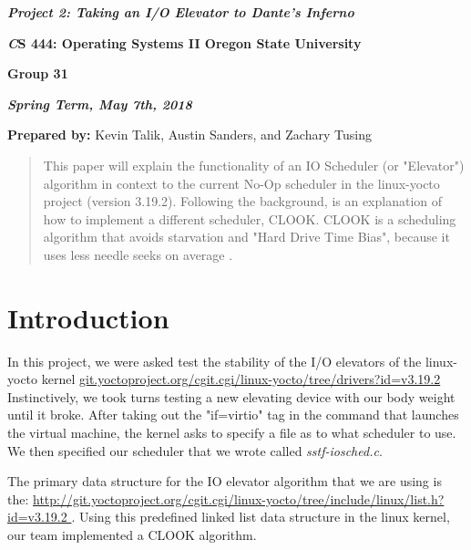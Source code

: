 \documentclass[onecolumn, draftclsnofoot,10pt, compsoc]{IEEEtran}
\def \ClassName{		CS 444: Operating Systems II }
\def \TeamNumber{		Group 31}
\def \GroupMemberOne{			Kevin Talik}
\def \GroupMemberTwo{			Austin Sanders}
\def \GroupMemberThree{			Zachary Tusing}
\begin{document}
 	\begin{center}
	\huge\bf{ } 
   
    \large\textbf{\textit{ Project 2: Taking an I/O Elevator to Dante's Inferno }}\par
     
    
    
	\small{\bf\textit \ClassName Oregon State University}\par
    \small{\bf{\TeamNumber}}
    
    
    {\bf\textit{ Spring Term, May 7th, 2018} }
    
    
    {\small {\bf Prepared by:} \GroupMemberOne, \GroupMemberTwo, and \GroupMemberThree }
        \end{center}
 		\vfill
		\begin{abstract}
        This paper will explain the functionality of an IO Scheduler (or "Elevator") algorithm in context to the current No-Op scheduler in the linux-yocto project (version 3.19.2). Following the background, is an explanation of how to implement a different scheduler, CLOOK. CLOOK is a scheduling algorithm that avoids starvation and "Hard Drive Time Bias", because it uses less needle seeks on average \cite{iitDiskAlgs:1}.
        \end{abstract}
    
		
       \pagebreak
       \section{Introduction }
		 In this project, we were asked test the stability of the I/O elevators of the linux-yocto kernel \url{git.yoctoproject.org/cgit.cgi/linux-yocto/tree/drivers?id=v3.19.2}
          Instinctively, we took turns testing a new elevating device with our body weight until it broke. After taking out the "if=virtio" tag in the command that launches the virtual machine, the kernel asks to specify a file as to what scheduler to use. We then specified our scheduler that we wrote called \textit{sstf-iosched.c}.

		 The primary data structure for the IO elevator algorithm that we are using is the: \url{http://git.yoctoproject.org/cgit.cgi/linux-yocto/tree/include/linux/list.h?id=v3.19.2 }.
         Using this predefined linked list data structure in the linux kernel, our team implemented a CLOOK algorithm.
\end{document}
